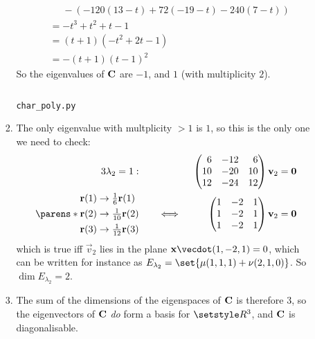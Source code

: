 \documentclass[fleqn,a4paper,11pt]{article}
\begin{document}
\begin{enumerate}[label=\textbf{\arabic*.}]
\begin{enumerate}[label=(\textbf{\Alph*})]
\begin{enumerate}[label=(\roman*)]
\begin{align*}
         &\phantom{={}} - (-120(13 - t) + 72(-19 - t) - 240(7 - t)) \\
         &= -t^3 + t^2 + t - 1 \\
         &= (t + 1)(-t^2 + 2t - 1) \\
         &= -(t + 1)(t - 1)^2
       \end{align*}
       So the eigenvalues of \(\mathbf{C}\) are \(-1\), and \(1\) (with multiplicity
       \(2\)).
       \begin{listing}[H]
        \inputminted{python}{char_poly.py}
        \caption{\texttt{char\_poly.py} \label{listing_py}}
       \end{listing}
      \item
       The only eigenvalue with multplicity \(> 1\) is \(1\), so this is the
       only one we need to check:
       \begin{alignat*}3
        \lambda_2 = 1:\quad
        && &&\begin{pmatrix*}[r]
         6 & -12 & 6 \\
         10 & -20 & 10 \\
         12 & -24 & 12
        \end{pmatrix*}
        \vec v_2 &= \vec 0 \\
        \parens*{
         \begin{aligned}
          \vec r(1) &\to \tfrac 16 \vec r(1) \\
          \vec r(2) &\to \tfrac 1{10} \vec r(2) \\
          \vec r(3) &\to \tfrac 1{12} \vec r(3)
         \end{aligned}
        } \quad
        &&\iff{}&&\begin{pmatrix*}[r]
         1 & -2 & 1 \\
         1 & -2 & 1 \\
         1 & -2 & 1
        \end{pmatrix*}
        \vec v_2 &= \vec 0
       \end{alignat*}
       which is true iff \(\vec v_2\) lies in the plane
       \(\vec x \vecdot (1, -2, 1) = 0\), which can be written for instance as
       \(E_{\lambda_2} = \set{\mu(1, 1, 1) + \nu(2, 1, 0)}\). So
       \(\dim E_{\lambda_2} = 2\).
      \item
       The sum of the dimensions of the eigenspaces of \(\mathbf{C}\) is therefore
       \(3\), so the eigenvectors of \(\mathbf{C}\) \emph{do} form a basis for
       \(\Reals^3\), and \(\mathbf{C}\) is diagonalisable.
     \end{enumerate}

\end{enumerate}
\end{enumerate}
\end{document}

